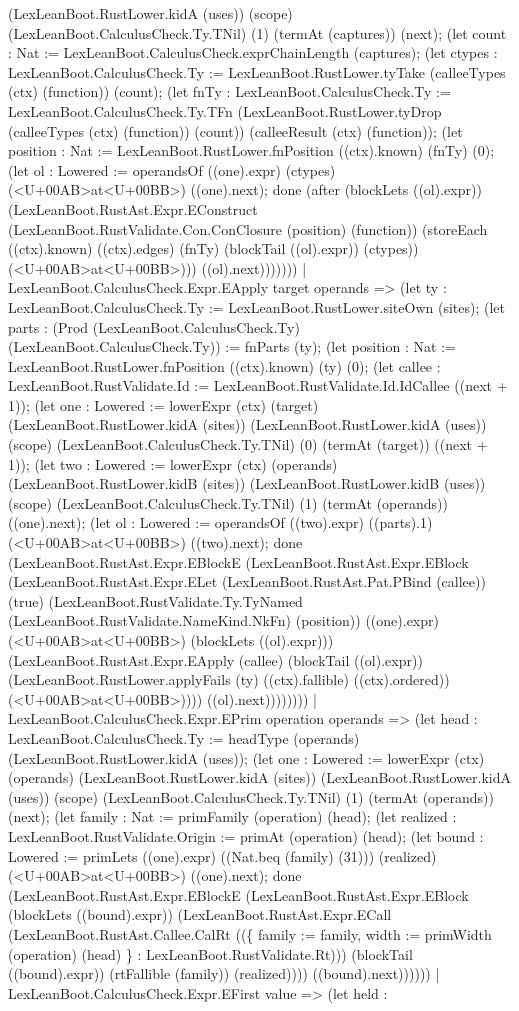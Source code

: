 \documentclass[11pt]{article}
\begin{document}
(LexLeanBoot.RustLower.kidA (uses)) (scope) (LexLeanBoot.CalculusCheck.Ty.TNil) (1) (termAt (captures)) (next); (let count : Nat := LexLeanBoot.CalculusCheck.exprChainLength (captures); (let ctypes : LexLeanBoot.CalculusCheck.Ty := LexLeanBoot.RustLower.tyTake (calleeTypes (ctx) (function)) (count); (let fnTy : LexLeanBoot.CalculusCheck.Ty := LexLeanBoot.CalculusCheck.Ty.TFn (LexLeanBoot.RustLower.tyDrop (calleeTypes (ctx) (function)) (count)) (calleeResult (ctx) (function)); (let position : Nat := LexLeanBoot.RustLower.fnPosition ((ctx).known) (fnTy) (0); (let ol : Lowered := operandsOf ((one).expr) (ctypes) (<U+00AB>at<U+00BB>) ((one).next); done (after (blockLets ((ol).expr)) (LexLeanBoot.RustAst.Expr.EConstruct (LexLeanBoot.RustValidate.Con.ConClosure (position) (function)) (storeEach ((ctx).known) ((ctx).edges) (fnTy) (blockTail ((ol).expr)) (ctypes)) (<U+00AB>at<U+00BB>))) ((ol).next))))))) | LexLeanBoot.CalculusCheck.Expr.EApply target operands => (let ty : LexLeanBoot.CalculusCheck.Ty := LexLeanBoot.RustLower.siteOwn (sites); (let parts : (Prod (LexLeanBoot.CalculusCheck.Ty) (LexLeanBoot.CalculusCheck.Ty)) := fnParts (ty); (let position : Nat := LexLeanBoot.RustLower.fnPosition ((ctx).known) (ty) (0); (let callee : LexLeanBoot.RustValidate.Id := LexLeanBoot.RustValidate.Id.IdCallee ((next + 1)); (let one : Lowered := lowerExpr (ctx) (target) (LexLeanBoot.RustLower.kidA (sites)) (LexLeanBoot.RustLower.kidA (uses)) (scope) (LexLeanBoot.CalculusCheck.Ty.TNil) (0) (termAt (target)) ((next + 1)); (let two : Lowered := lowerExpr (ctx) (operands) (LexLeanBoot.RustLower.kidB (sites)) (LexLeanBoot.RustLower.kidB (uses)) (scope) (LexLeanBoot.CalculusCheck.Ty.TNil) (1) (termAt (operands)) ((one).next); (let ol : Lowered := operandsOf ((two).expr) ((parts).1) (<U+00AB>at<U+00BB>) ((two).next); done (LexLeanBoot.RustAst.Expr.EBlockE (LexLeanBoot.RustAst.Expr.EBlock (LexLeanBoot.RustAst.Expr.ELet (LexLeanBoot.RustAst.Pat.PBind (callee)) (true) (LexLeanBoot.RustValidate.Ty.TyNamed (LexLeanBoot.RustValidate.NameKind.NkFn) (position)) ((one).expr) (<U+00AB>at<U+00BB>) (blockLets ((ol).expr))) (LexLeanBoot.RustAst.Expr.EApply (callee) (blockTail ((ol).expr)) (LexLeanBoot.RustLower.applyFails (ty) ((ctx).fallible) ((ctx).ordered)) (<U+00AB>at<U+00BB>)))) ((ol).next)))))))) | LexLeanBoot.CalculusCheck.Expr.EPrim operation operands => (let head : LexLeanBoot.CalculusCheck.Ty := headType (operands) (LexLeanBoot.RustLower.kidA (uses)); (let one : Lowered := lowerExpr (ctx) (operands) (LexLeanBoot.RustLower.kidA (sites)) (LexLeanBoot.RustLower.kidA (uses)) (scope) (LexLeanBoot.CalculusCheck.Ty.TNil) (1) (termAt (operands)) (next); (let family : Nat := primFamily (operation) (head); (let realized : LexLeanBoot.RustValidate.Origin := primAt (operation) (head); (let bound : Lowered := primLets ((one).expr) ((Nat.beq (family) (31))) (realized) (<U+00AB>at<U+00BB>) ((one).next); done (LexLeanBoot.RustAst.Expr.EBlockE (LexLeanBoot.RustAst.Expr.EBlock (blockLets ((bound).expr)) (LexLeanBoot.RustAst.Expr.ECall (LexLeanBoot.RustAst.Callee.CalRt ((\{ family := family, width := primWidth (operation) (head) \} : LexLeanBoot.RustValidate.Rt))) (blockTail ((bound).expr)) (rtFallible (family)) (realized)))) ((bound).next)))))) | LexLeanBoot.CalculusCheck.Expr.EFirst value => (let held : 
\end{document}

